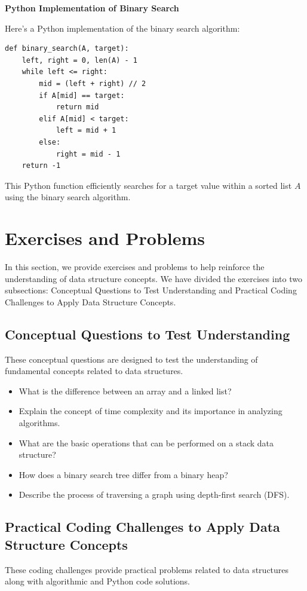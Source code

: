 \documentclass[12pt]{book} %
\begin{document}
\FloatBarrier
\textbf{Python Implementation of Binary Search}


Here's a Python implementation of the binary search algorithm:
\FloatBarrier
\begin{lstlisting}
def binary_search(A, target):
    left, right = 0, len(A) - 1
    while left <= right:
        mid = (left + right) // 2
        if A[mid] == target:
            return mid
        elif A[mid] < target:
            left = mid + 1
        else:
            right = mid - 1
    return -1
\end{lstlisting}
\FloatBarrier
This Python function efficiently searches for a target value within a sorted list $A$ using the binary search algorithm.


\section{Exercises and Problems}
In this section, we provide exercises and problems to help reinforce the understanding of data structure concepts. We have divided the exercises into two subsections: Conceptual Questions to Test Understanding and Practical Coding Challenges to Apply Data Structure Concepts.

\subsection{Conceptual Questions to Test Understanding}
These conceptual questions are designed to test the understanding of fundamental concepts related to data structures.

\begin{itemize}
    \item What is the difference between an array and a linked list?
    \item Explain the concept of time complexity and its importance in analyzing algorithms.
    \item What are the basic operations that can be performed on a stack data structure?
    \item How does a binary search tree differ from a binary heap?
    \item Describe the process of traversing a graph using depth-first search (DFS).
\end{itemize}

\subsection{Practical Coding Challenges to Apply Data Structure Concepts}
These coding challenges provide practical problems related to data structures along with algorithmic and Python code solutions.
\end{document}
